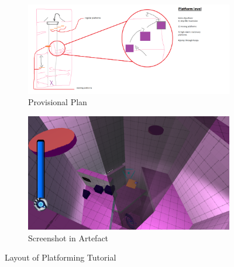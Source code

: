 \begin{figure}[H]
\centering
\begin{subfigure}{0.5\textwidth}
  \centering
  \includegraphics[width=1\linewidth]{Figures/platformplan.png}
  \caption{Provisional Plan}
\end{subfigure}%
\begin{subfigure}{0.5\textwidth}
  \centering
  \includegraphics[width=1\linewidth]{Figures/platform.png}
  \caption{Screenshot in Artefact}
\end{subfigure}
\caption{Layout of Platforming Tutorial}
\end{figure}

